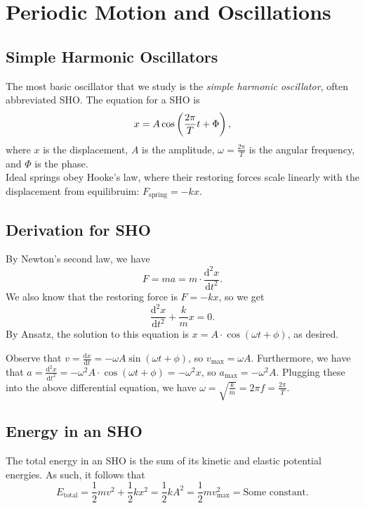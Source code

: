 \documentclass[class=article, crop=false]{standalone}
\begin{document}
  \section{Periodic Motion and Oscillations}
  \subsection{Simple Harmonic Oscillators}
  The most basic oscillator that we study is the \emph{simple harmonic oscillator}, often abbreviated SHO. The equation for a SHO is
  \[
    x = A\cos \left( \frac{2\pi}{T}t + \Phi \right),
  \]
  where $x$ is the displacement, $A$ is the amplitude, $\omega=\frac{2\pi}{T}$ is the angular frequency, and $\Phi$ is the phase. \\[10pt]
  Ideal springs obey Hooke's law, where their restoring forces scale linearly with the displacement from equilibruim: $F_{\text{spring}} = -kx$.
  \subsection{Derivation for SHO}
  By Newton's second law, we have 
  \[
    F = ma = m\cdot \frac{\mathrm{d}^2x}{\mathrm{d}t^2}.
  \]
  We also know that the restoring force is $F=-kx$, so we get
  \[
    \frac{\mathrm{d}^2x}{\mathrm{d}t^2} + \frac{k}{m}x = 0.
  \]
  By Ansatz, the solution to this equation is $x = A\cdot\cos(\omega t + \phi)$, as desired.
  \begin{note}{}
    Observe that $v = \frac{\mathrm{d}x}{\mathrm{d}t} = -\omega A\sin (\omega t + \phi)$, so $v_{\text{max}} = \omega A$. Furthermore, we have that $a = \frac{\mathrm{d}^2x}{\mathrm{d}t^2} = -\omega^2A \cdot\cos(\omega t + \phi) = -\omega^2 x$, so $a_{\text{max}} = -\omega^2A$. Plugging these into the above differential equation, we have $\omega = \sqrt{\frac{k}{m}} = 2\pi f = \frac{2\pi}{T}$.
  \end{note}
  \subsection{Energy in an SHO}
  The total energy in an SHO is the sum of its kinetic and elastic potential energies. As such, it follows that
  \[
    E_{\text{total}} = \frac{1}{2}mv^2+\frac{1}{2}kx^2 = \frac{1}{2}kA^2 = \frac{1}{2}mv_{\text{max}}^2 = \text{Some constant}.
  \]
\end{document}
